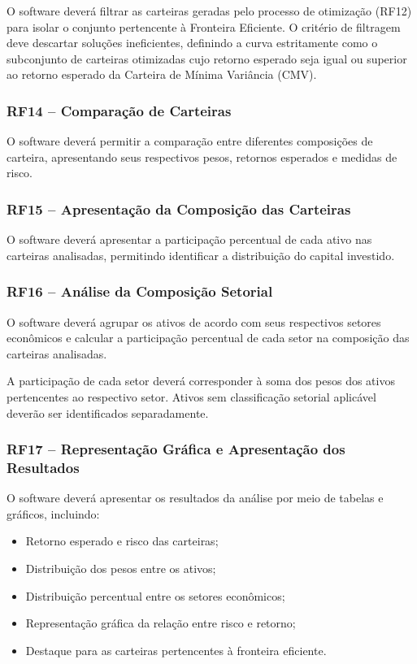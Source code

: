 O software deverá filtrar as carteiras geradas pelo processo de otimização (RF12) para isolar o conjunto pertencente à Fronteira Eficiente. O critério de filtragem deve descartar soluções ineficientes, definindo a curva estritamente como o subconjunto de carteiras otimizadas cujo retorno esperado seja igual ou superior ao retorno esperado da Carteira de Mínima Variância (CMV).

\subsubsection{RF14 -- Comparação de Carteiras}

O software deverá permitir a comparação entre diferentes
composições de carteira, apresentando seus respectivos
pesos, retornos esperados e medidas de risco.

\subsubsection{RF15 -- Apresentação da Composição das Carteiras}

O software deverá apresentar a participação percentual de
cada ativo nas carteiras analisadas, permitindo identificar
a distribuição do capital investido.

\subsubsection{RF16 -- Análise da Composição Setorial}

O software deverá agrupar os ativos de acordo com seus
respectivos setores econômicos e calcular a participação
percentual de cada setor na composição das carteiras
analisadas.

A participação de cada setor deverá corresponder à soma
dos pesos dos ativos pertencentes ao respectivo setor.
Ativos sem classificação setorial aplicável deverão ser
identificados separadamente.

\subsubsection{RF17 -- Representação Gráfica e Apresentação
dos Resultados}

O software deverá apresentar os resultados da análise por
meio de tabelas e gráficos, incluindo:

\begin{itemize}
    \item Retorno esperado e risco das carteiras;

    \item Distribuição dos pesos entre os ativos;

    \item Distribuição percentual entre os setores econômicos;

    \item Representação gráfica da relação entre risco e
    retorno;

    \item Destaque para as carteiras pertencentes à fronteira
    eficiente.
\end{itemize}

